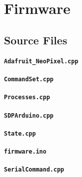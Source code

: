 %
%

\section{Firmware}

\subsection{Source Files}


\paragraph{\texttt{Adafruit\_NeoPixel.cpp}}

\paragraph{\texttt{CommandSet.cpp}}

\paragraph{\texttt{Processes.cpp}}

\paragraph{\texttt{SDPArduino.cpp}}

\paragraph{\texttt{State.cpp}}

\paragraph{\texttt{firmware.ino}}

\paragraph{\texttt{SerialCommand.cpp}}
